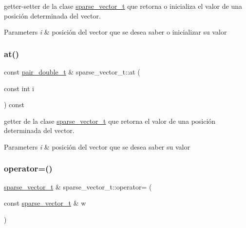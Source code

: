 getter-\/setter de la clase \hyperlink{classsparse__vector__t}{sparse\+\_\+vector\+\_\+t} que retorna o inicializa el valor de una posición determinada del vector. 


\begin{DoxyParams}{Parameters}
{\em i} & posición del vector que se desea saber o inicializar su valor \\
\hline
\end{DoxyParams}
\mbox{\label{classsparse__vector__t_a33f0b1b839db166e01023915c1d97d39}} 
\subsubsection{\texorpdfstring{at()}{at()}\hspace{0.1cm}{\footnotesize\ttfamily [2/2]}}
{\footnotesize\ttfamily const \hyperlink{classpair__t}{pair\+\_\+double\+\_\+t} \& sparse\+\_\+vector\+\_\+t\+::at (\begin{DoxyParamCaption}\item[{const int}]{i }\end{DoxyParamCaption}) const}



getter de la clase \hyperlink{classsparse__vector__t}{sparse\+\_\+vector\+\_\+t} que retorna el valor de una posición determinada del vector. 


\begin{DoxyParams}{Parameters}
{\em i} & posición del vector que se desea saber su valor \\
\hline
\end{DoxyParams}
\mbox{\label{classsparse__vector__t_a5af8b6772b5e21b427ba8db08742ff9b}} 
\subsubsection{\texorpdfstring{operator=()}{operator=()}}
{\footnotesize\ttfamily \hyperlink{classsparse__vector__t}{sparse\+\_\+vector\+\_\+t} \& sparse\+\_\+vector\+\_\+t\+::operator= (\begin{DoxyParamCaption}\item[{const \hyperlink{classsparse__vector__t}{sparse\+\_\+vector\+\_\+t} \&}]{w }\end{DoxyParamCaption})}



